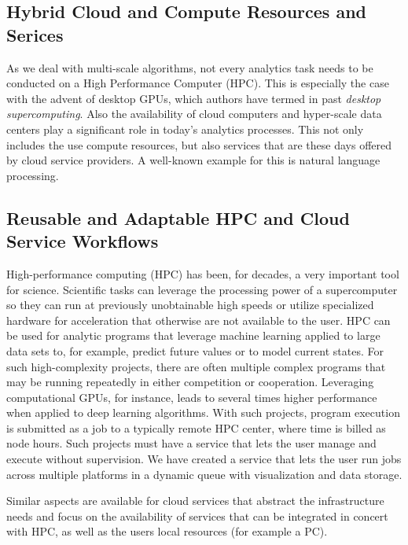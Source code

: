 \documentclass[sigplan,screen]{acmart}
\begin{document}
\subsection{Hybrid Cloud and Compute Resources and Serices}

As we deal with multi-scale algorithms, not every analytics task needs
to be conducted on a High Performance Computer (HPC). This is
especially the case with the advent of desktop GPUs, which authors
have termed in past {\em desktop supercomputing}. Also the
availability of cloud computers and hyper-scale data centers play a
significant role in today's analytics processes. This not only
includes the use compute resources, but also services that are these
days offered by cloud service providers. A well-known example for this
is natural language processing.

\subsection{Reusable and Adaptable HPC and Cloud Service Workflows}

High-performance computing (HPC) has been, for decades, a very important tool
for science. Scientific tasks can leverage the processing power of
a supercomputer so they can run at previously unobtainable high speeds
or utilize specialized hardware for acceleration that otherwise are not
available to the user. HPC can be used for analytic programs that
leverage machine learning applied to large data sets to, for example,
predict future values or to model current states. For such
high-complexity projects, there are often multiple complex programs that
may be running repeatedly in either competition or cooperation.
Leveraging computational GPUs, for instance, leads to several times higher
performance when applied to deep learning algorithms. With such
projects, program execution is submitted as a job to a typically remote
HPC center, where time is billed as node hours. Such projects must have
a service that lets the user manage and execute without supervision. We
have created a service that lets the user run jobs across multiple
platforms in a dynamic queue with visualization and data storage.

Similar aspects are available for cloud services that abstract the
infrastructure needs and focus on the availability of services that
can be integrated in concert with HPC, as well as the users local
resources (for example a PC).




% 
\end{document}
